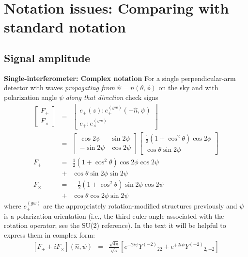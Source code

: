 \documentclass[twocolumn,prd,nofootinbib]{revtex4}
\newcommand\editremark[1]{{\color{red} #1}}
\newcommand\Y[1]{Y^{(#1)}{}}
\begin{document}
\section{Notation issues: Comparing with standard notation}

\subsection{Signal amplitude}

\noindent \textbf{Single-interferometer: Complex notation}
For a single perpendicular-arm detector with waves \emph{propagating from} $\hat{n}=n(\theta,\phi)$ on the sky and with
polarization angle $\psi$ \emph{along that direction} \editremark{check signs}
\begin{subequations}
\label{eq:SingleIFOResponse}
\begin{eqnarray}
\begin{bmatrix}
F_+ \\ F_\times 
\end{bmatrix}
&=& \begin{bmatrix}
e_+(z):e_+^{(gw)}(-\hat{n},\psi) \\
e_+:e_\times^{(gw)} 
\end{bmatrix}
 \\
&=& 
\begin{bmatrix}
\cos 2\psi & \sin 2 \psi \\
- \sin 2 \psi & \cos 2 \psi
\end{bmatrix}
\begin{bmatrix}
\frac{1}{2} (1+\cos^2\theta) \cos2\phi  \\
\cos \theta \sin 2 \phi
\end{bmatrix} \nonumber
\\
F_\mathrm{+} &=&
 \frac{1}{2}(1+\cos^{2} \theta) \cos 2 \phi \cos 2 \psi
\nonumber\\ &+& \cos \theta \sin 2 \phi \sin 2 \psi \, \\ 
F_\mathrm{\times} &=&- \frac{1}{2}(1+\cos^{2} \theta) \sin 2 \phi \cos 2 \psi
\nonumber \\ &+& \cos \theta \cos 2 \phi \sin 2 \psi
\end{eqnarray}
\end{subequations}
where $e_+^{(gw)}$ are the appropriately rotation-modified structures
previously and $\psi$ is a polarization orientation (i.e., the third
euler angle associated with the rotation operator; see the SU(2) reference).  
%
In the text it will be helpful to express them in complex form:
\begin{eqnarray}
{} [F_{+}+i F_{\times}](\hat{n},\psi) &=& \frac{\sqrt{4\pi}}{\sqrt{5}}\left[ e^{-2i\psi}\Y{-2}_{22} +
  e^{+2i\psi}\Y{-2}_{2,-2}  \right] 
\end{eqnarray}
\end{document}
